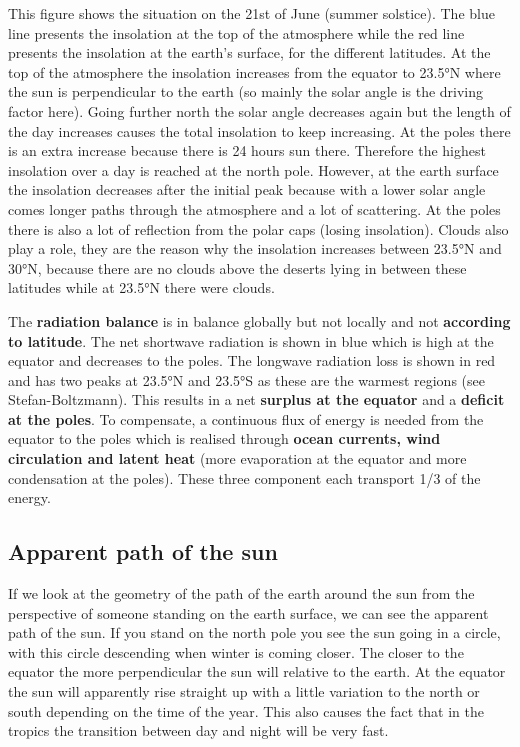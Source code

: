 \documentclass[oneside]{book}
\begin{document}
This figure shows the situation on the 21st of June (summer solstice).
The blue line presents the insolation at the top of the atmosphere while
the red line presents the insolation at the earth's surface, for the
different latitudes. At the top of the atmosphere the insolation
increases from the equator to 23.5°N where the sun is perpendicular to
the earth (so mainly the solar angle is the driving factor here). Going
further north the solar angle decreases again but the length of the day
increases causes the total insolation to keep increasing. At the poles
there is an extra increase because there is 24 hours sun there.
Therefore the highest insolation over a day is reached at the north
pole. However, at the earth surface the insolation decreases after the
initial peak because with a lower solar angle comes longer paths through
the atmosphere and a lot of scattering. At the poles there is also a lot
of reflection from the polar caps (losing insolation). Clouds also play
a role, they are the reason why the insolation increases between 23.5°N
and 30°N, because there are no clouds above the deserts lying in between
these latitudes while at 23.5°N there were clouds.

The \textbf{radiation balance} is in balance globally but not locally
and not \textbf{according to latitude}. The net shortwave radiation is
shown in blue which is high at the equator and decreases to the poles.
The longwave radiation loss is shown in red and has two peaks at 23.5°N
and 23.5°S as these are the warmest regions (see Stefan-Boltzmann). This
results in a net \textbf{surplus at the equator} and a \textbf{deficit
at the poles}. To compensate, a continuous flux of energy is needed from
the equator to the poles which is realised through \textbf{ocean
currents, wind circulation and latent heat} (more evaporation at the
equator and more condensation at the poles). These three component each
transport 1/3 of the energy.

\subsection{Apparent path of the sun}\label{apparent-path-of-the-sun}

If we look at the geometry of the path of the earth around the sun from
the perspective of someone standing on the earth surface, we can see the
apparent path of the sun. If you stand on the north pole you see the sun
going in a circle, with this circle descending when winter is coming
closer. The closer to the equator the more perpendicular the sun will
relative to the earth. At the equator the sun will apparently rise
straight up with a little variation to the north or south depending on
the time of the year. This also causes the fact that in the tropics the
transition between day and night will be very fast.
\end{document}
